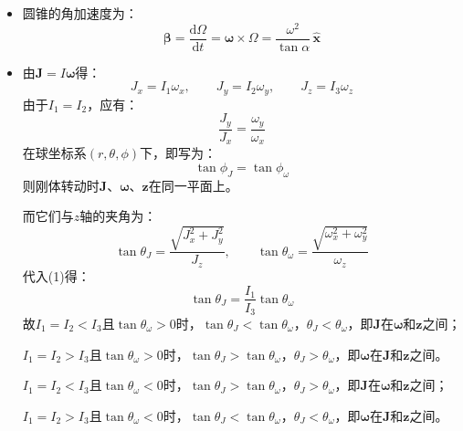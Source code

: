\documentclass[a4paper,fontset=windows]{ctexart}
\begin{document}
\begin{itemize}
        \medskip
        \item[4.4.(3)]
        圆锥的角加速度为：
        \[
        \bm{\beta} = \dfrac{\mathrm{d}\bm{\varOmega}}{\mathrm{d}t} = \bm{\omega} \times \bm{\varOmega} = \frac{\omega^2}{\tan\alpha}\,\bm{\hat{x}}
        \]

        \bigskip
        \item[5.2]
        由$\bm{J} = I\bm{\omega}$得：
        \begin{equation}
        J_x = I_1\omega_x,\qquad J_y = I_2\omega_y,\qquad J_z = I_3\omega_z
        \end{equation}
        由于$I_1 = I_2$，应有：
        \[
        \frac{J_y}{J_x} = \frac{\omega_y}{\omega_x}
        \]
        在球坐标系$(r,\theta,\phi)$下，即写为：
        \[
        \tan\phi_J = \tan\phi_\omega
        \]
        则刚体转动时$\bm{J}$、$\bm{\omega}$、$\bm{z}$在同一平面上。

        而它们与$z$轴的夹角为：
        \[
        \tan\theta_J = \frac{\sqrt{J_x^2 + J_y^2}}{J_z},\qquad \tan\theta_\omega = \frac{\sqrt{\omega_x^2 + \omega_y^2}}{\omega_z}
        \]
        代入(1)得：
        \[
        \tan\theta_J = \frac{I_1}{I_3}\tan\theta_\omega
        \]
        故$I_1 = I_2 < I_3$且$\tan\theta_\omega > 0$时，$\tan\theta_J < \tan\theta_\omega$，$\theta_J < \theta_\omega$，即$\bm{J}$在$\bm{\omega}$和$\bm{z}$之间；

        $I_1 = I_2 > I_3$且$\tan\theta_\omega > 0$时，$\tan\theta_J > \tan\theta_\omega$，$\theta_J > \theta_\omega$，即$\bm{\omega}$在$\bm{J}$和$\bm{z}$之间。

        $I_1 = I_2 < I_3$且$\tan\theta_\omega < 0$时，$\tan\theta_J > \tan\theta_\omega$，$\theta_J > \theta_\omega$，即$\bm{J}$在$\bm{\omega}$和$\bm{z}$之间；

        $I_1 = I_2 > I_3$且$\tan\theta_\omega < 0$时，$\tan\theta_J < \tan\theta_\omega$，$\theta_J < \theta_\omega$，即$\bm{\omega}$在$\bm{J}$和$\bm{z}$之间。


\end{itemize}
\end{document}
